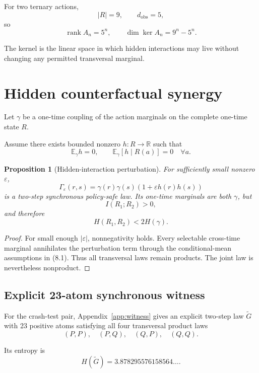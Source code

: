 \documentclass[11pt,a4paper]{article}
\newtheorem{proposition}[theorem]{Proposition}
\newcommand{\E}{\mathbb E}
\newcommand{\R}{\mathbb R}
\newcommand{\1}{\mathbf 1}
\begin{document}
For two ternary actions,
\[
|R|=9,\qquad d_{\mathrm{obs}}=5,
\]
so
\[
\operatorname{rank}A_n=5^n,
\qquad
\dim\ker A_n=9^n-5^n.
\tag{7.5}
\]

The kernel is the linear space in which hidden interactions may live
without changing any permitted transversal marginal.


\section{Hidden counterfactual synergy}

Let \(\gamma\) be a one-time coupling of the action marginals on the
complete one-time state \(R\).

Assume there exists bounded nonzero \(h:R\to\R\) such that
\[
\E_\gamma h=0,
\qquad
\E_\gamma[h\mid R(a)]=0
\quad
\forall a.
\tag{8.1}
\]

\begin{proposition}[Hidden-interaction perturbation]
For sufficiently small nonzero \(\varepsilon\),
\[
\Gamma_\varepsilon(r,s)
=
\gamma(r)\gamma(s)
\left(
1+\varepsilon h(r)h(s)
\right)
\tag{8.2}
\]
is a two-step synchronous policy-safe law.
Its one-time marginals are both \(\gamma\), but
\[
I(R_1;R_2)>0,
\]
and therefore
\[
H(R_1,R_2)
<
2H(\gamma).
\tag{8.3}
\]
\end{proposition}

\begin{proof}
For small enough \(|\varepsilon|\), nonnegativity holds.
Every selectable cross-time marginal annihilates the perturbation term
through the conditional-mean assumptions in (8.1).
Thus all transversal laws remain products.
The joint law is nevertheless nonproduct.
\end{proof}


\subsection{Explicit 23-atom synchronous witness}

For the crash-test pair, Appendix~\ref{app:witness} gives an explicit
two-step law \(\widetilde G\) with 23 positive atoms satisfying all four
transversal product laws
\[
(P,P),\quad(P,Q),\quad(Q,P),\quad(Q,Q).
\]

Its entropy is
\[
\boxed{
H(\widetilde G)
=
3.878295576158564\ldots.
}
\tag{8.4}
\]
\end{document}
